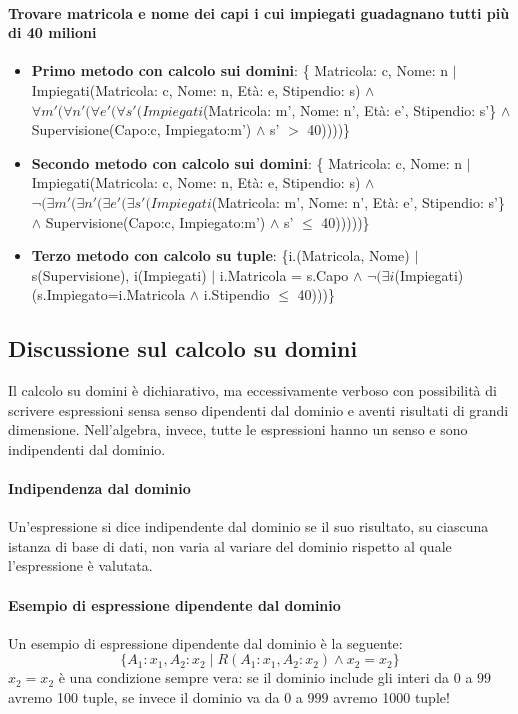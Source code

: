 \paragraph{Trovare matricola e nome dei capi i cui impiegati guadagnano tutti più di 40 milioni}
\begin{itemize}
	\item \textbf{Primo metodo con calcolo sui domini}: \{ Matricola: c, Nome: n $|$ Impiegati(Matricola: c, Nome: n, Età: e, Stipendio: s) $\land$ $\forall m'(\forall n' (\forall e' ( \forall s'(Impiegati$(Matricola: m', Nome: n', Età: e', Stipendio: s'\} $\land$ Supervisione(Capo:c, Impiegato:m') $\land$ s' $>$ 40))))\}
	\item \textbf{Secondo metodo con calcolo sui domini}: \{ Matricola: c, Nome: n $|$ Impiegati(Matricola: c, Nome: n, Età: e, Stipendio: s) $\land$ $\neg(\exists m'(\exists n' (\exists e' ( \exists s'(Impiegati$(Matricola: m', Nome: n', Età: e', Stipendio: s'\} $\land$ Supervisione(Capo:c, Impiegato:m') $\land$ s' $\leq$ 40)))))\}
	\item \textbf{Terzo metodo con calcolo su tuple}: \{i.(Matricola, Nome) $|$ s(Supervisione), i(Impiegati) $|$ i.Matricola = s.Capo $\land$ $\neg(\exists i$(Impiegati)(s.Impiegato=i.Matricola $\land$ i.Stipendio $\leq$ 40)))\}
\end{itemize}
\subsection{Discussione sul calcolo su domini}
Il calcolo su domini è dichiarativo, ma eccessivamente verboso con possibilità di scrivere espressioni sensa senso dipendenti dal dominio e aventi risultati di grandi dimensione. Nell'algebra, invece, tutte le espressioni hanno un senso e sono indipendenti dal dominio.
\paragraph{Indipendenza dal dominio} Un'espressione si dice indipendente dal dominio se il suo risultato, su ciascuna istanza di base di dati, non varia al variare del dominio rispetto al quale l'espressione è valutata.
\paragraph{Esempio di espressione dipendente dal dominio} Un esempio di espressione dipendente dal dominio è la seguente:
\[\{ A_1 : x_1, A_2 : x_2\;|\;R(A_1 : x_1, A_2 : x_2) \land x_2 = x_2 \}\]
$x_2 = x_2$ è una condizione sempre vera: se il dominio include gli interi da $0$ a $99$ avremo 100 tuple, se invece il dominio va da $0$ a $999$ avremo 1000 tuple!
